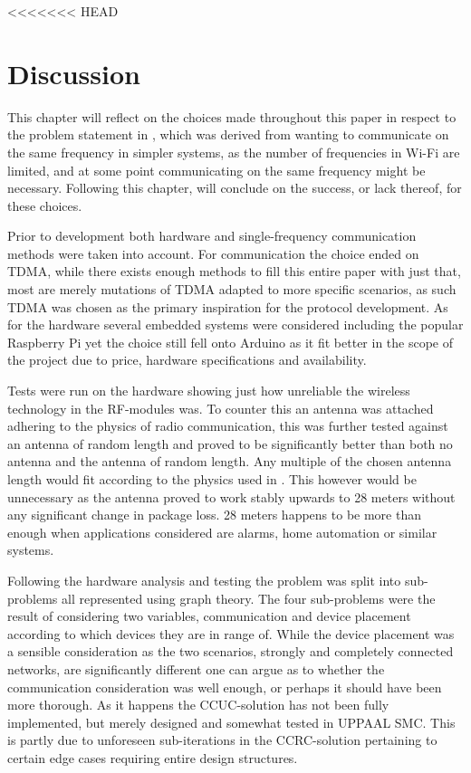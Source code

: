 <<<<<<< HEAD
\chapter{Discussion}\label{Discussion}
This chapter will reflect on the choices made throughout this paper in respect to the problem statement in , which was derived from wanting to communicate on the same frequency in simpler systems, as the number of frequencies in Wi-Fi are limited, and at some point communicating on the same frequency might be necessary.
Following this chapter,  will conclude on the success, or lack thereof, for these choices.

\bigskip \noindent
Prior to development both hardware and single-frequency communication methods were taken into account.
For communication the choice ended on TDMA, while there exists enough methods to fill this entire paper with just that, most are merely mutations of TDMA adapted to more specific scenarios, as such TDMA was chosen as the primary inspiration for the protocol development.
As for the hardware several embedded systems were considered including the popular Raspberry Pi yet the choice still fell onto Arduino as it fit better in the scope of the project due to price, hardware specifications and availability.

Tests were run on the hardware showing just how unreliable the wireless technology in the RF-modules was.
To counter this an antenna was attached adhering to the physics of radio communication, this was further tested against an antenna of random length and proved to be significantly better than both no antenna and the antenna of random length.
Any multiple of the chosen antenna length would fit according to the physics used in .
This however would be unnecessary as the antenna proved to work stably upwards to 28 meters without any significant change in package loss.
28 meters happens to be more than enough when applications considered are alarms, home automation or similar systems.

\bigskip \noindent
Following the hardware analysis and testing the problem was split into sub-problems all represented using graph theory.
The four sub-problems were the result of considering two variables, communication and device placement according to which devices they are in range of.
While the device placement was a sensible consideration as the two scenarios, strongly and completely connected networks, are significantly different one can argue as to whether the communication consideration was well enough, or perhaps it should have been more thorough.
As it happens the CCUC-solution has not been fully implemented, but merely designed and somewhat tested in UPPAAL SMC.
This is partly due to unforeseen sub-iterations in the CCRC-solution pertaining to certain edge cases requiring entire design structures.

